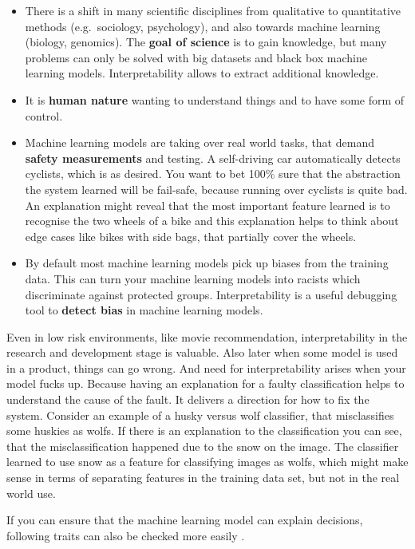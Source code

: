 \documentclass[12pt,]{krantz}
\providecommand{\tightlist}{%
  \setlength{\itemsep}{0pt}\setlength{\parskip}{0pt}}
\theoremstyle{definition}
\theoremstyle{definition}
\theoremstyle{definition}
\theoremstyle{remark}
\begin{document}
\begin{itemize}
\tightlist
\item
  There is a shift in many scientific disciplines from qualitative to
  quantitative methods (e.g.~sociology, psychology), and also towards
  machine learning (biology, genomics). The \textbf{goal of science} is
  to gain knowledge, but many problems can only be solved with big
  datasets and black box machine learning models. Interpretability
  allows to extract additional knowledge.
\item
  It is \textbf{human nature} wanting to understand things and to have
  some form of control.
\item
  Machine learning models are taking over real world tasks, that demand
  \textbf{safety measurements} and testing. A self-driving car
  automatically detects cyclists, which is as desired. You want to bet
  100\% sure that the abstraction the system learned will be fail-safe,
  because running over cyclists is quite bad. An explanation might
  reveal that the most important feature learned is to recognise the two
  wheels of a bike and this explanation helps to think about edge cases
  like bikes with side bags, that partially cover the wheels.
\item
  By default most machine learning models pick up biases from the
  training data. This can turn your machine learning models into racists
  which discriminate against protected groups. Interpretability is a
  useful debugging tool to \textbf{detect bias} in machine learning
  models.
\end{itemize}

Even in low risk environments, like movie recommendation,
interpretability in the research and development stage is valuable. Also
later when some model is used in a product, things can go wrong. And
need for interpretability arises when your model fucks up. Because
having an explanation for a faulty classification helps to understand
the cause of the fault. It delivers a direction for how to fix the
system. Consider an example of a husky versus wolf classifier, that
misclassifies some huskies as wolfs. If there is an explanation to the
classification you can see, that the misclassification happened due to
the snow on the image. The classifier learned to use snow as a feature
for classifying images as wolfs, which might make sense in terms of
separating features in the training data set, but not in the real world
use.

If you can ensure that the machine learning model can explain decisions,
following traits can also be checked more easily
\citep{Doshi-Velez2017}.
\end{document}
